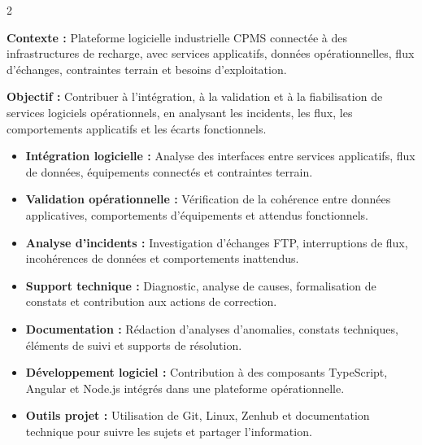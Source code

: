 \documentclass[8pt,a4paper,ragged2e,withhyper]{altacv}
\begin{document}



\makecvheader
\vspace{-0.3cm}


\begin{paracol}{2}



\textbf{Contexte :} Plateforme logicielle industrielle CPMS connectée à des infrastructures de recharge, avec services applicatifs, données opérationnelles, flux d’échanges, contraintes terrain et besoins d’exploitation.

\textbf{Objectif :} Contribuer à l’intégration, à la validation et à la fiabilisation de services logiciels opérationnels, en analysant les incidents, les flux, les comportements applicatifs et les écarts fonctionnels.

\begin{itemize}
  \item \textbf{Intégration logicielle :} Analyse des interfaces entre services applicatifs, flux de données, équipements connectés et contraintes terrain.
  \item \textbf{Validation opérationnelle :} Vérification de la cohérence entre données applicatives, comportements d’équipements et attendus fonctionnels.
  \item \textbf{Analyse d’incidents :} Investigation d’échanges FTP, interruptions de flux, incohérences de données et comportements inattendus.
  \item \textbf{Support technique :} Diagnostic, analyse de causes, formalisation de constats et contribution aux actions de correction.
  \item \textbf{Documentation :} Rédaction d’analyses d’anomalies, constats techniques, éléments de suivi et supports de résolution.
  \item \textbf{Développement logiciel :} Contribution à des composants TypeScript, Angular et Node.js intégrés dans une plateforme opérationnelle.
  \item \textbf{Outils projet :} Utilisation de Git, Linux, Zenhub et documentation technique pour suivre les sujets et partager l’information.
\end{itemize}


\end{paracol}
\end{document}

